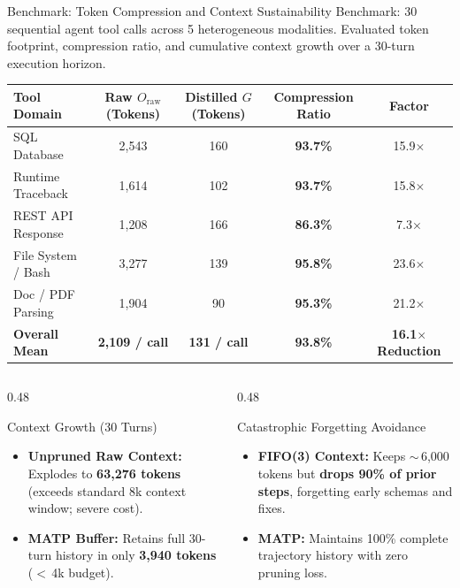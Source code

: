 \documentclass[aspectratio=169,10pt]{beamer}
\begin{document}
\begin{frame}{Benchmark: Token Compression and Context Sustainability}
  {\footnotesize Benchmark: 30 sequential agent tool calls across 5 heterogeneous modalities. Evaluated token footprint, compression ratio, and cumulative context growth over a 30-turn execution horizon.}

  \vspace{0.3em}
  \begin{table}
    \centering
    \footnotesize
    \begin{tabular}{lcccc}
      \toprule
      Tool Domain & Raw $O_{\mathrm{raw}}$ (Tokens) & Distilled $G$ (Tokens) & Compression Ratio & Factor\\
      \midrule
      SQL Database & 2,543 & 160 & \textbf{93.7\%} & 15.9$\times$\\
      Runtime Traceback & 1,614 & 102 & \textbf{93.7\%} & 15.8$\times$\\
      REST API Response & 1,208 & 166 & \textbf{86.3\%} & 7.3$\times$\\
      File System / Bash & 3,277 & 139 & \textbf{95.8\%} & 23.6$\times$\\
      Doc / PDF Parsing & 1,904 & 90 & \textbf{95.3\%} & 21.2$\times$\\
      \midrule
      \textbf{Overall Mean} & \textbf{2,109 / call} & \textbf{131 / call} & \textbf{93.8\%} & \textbf{16.1$\times$ Reduction}\\
      \bottomrule
    \end{tabular}
  \end{table}

  \begin{columns}[T,onlytextwidth]
    \begin{column}{0.48\textwidth}
      \begin{block}{Context Growth (30 Turns)}
        \begin{itemize}
          \footnotesize
          \item \textbf{Unpruned Raw Context:} Explodes to \textbf{63,276 tokens} (exceeds standard 8k context window; severe cost).
          \item \textbf{MATP Buffer:} Retains full 30-turn history in only \textbf{3,940 tokens} ($<$\,4k budget).
        \end{itemize}
      \end{block}
    \end{column}
    \begin{column}{0.48\textwidth}
      \begin{block}{Catastrophic Forgetting Avoidance}
        \begin{itemize}
          \footnotesize
          \item \textbf{FIFO(3) Context:} Keeps $\sim$\,6,000 tokens but \textbf{drops 90\% of prior steps}, forgetting early schemas and fixes.
          \item \textbf{MATP:} Maintains 100\% complete trajectory history with zero pruning loss.
        \end{itemize}
      \end{block}
    \end{column}
  \end{columns}
\end{frame}
\end{document}
